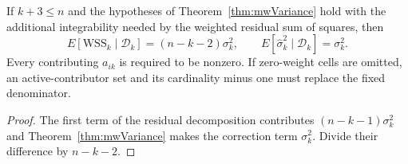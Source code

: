 \begin{theorem}\label{thm:mwSigmaUnbiased}\leanok
{}
If $k+3\le n$ and the hypotheses of Theorem~\ref{thm:mwVariance} hold with the additional
integrability needed by the weighted residual sum of squares, then
\[
 E[\mathrm{WSS}_k\mid\mathcal D_k]=(n-k-2)\sigma_k^2,
 \qquad E[\hat\sigma_k^2\mid\mathcal D_k]=\sigma_k^2.
\]
Every contributing $a_{ik}$ is required to be nonzero. If zero-weight cells are omitted, an
active-contributor set and its cardinality minus one must replace the fixed denominator.
\end{theorem}
\begin{proof}\leanok The first term of the residual decomposition contributes
$(n-k-1)\sigma_k^2$ and Theorem~\ref{thm:mwVariance} makes the correction term
$\sigma_k^2$. Divide their difference by $n-k-2$.
\end{proof}
